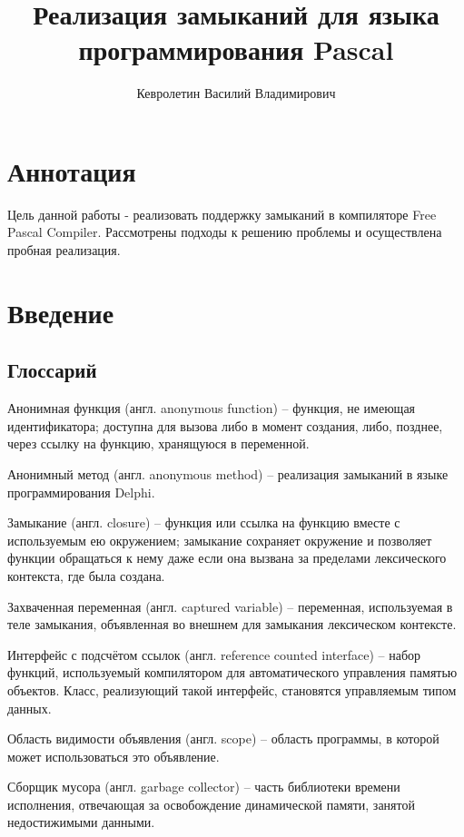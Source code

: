 \documentclass{imcs}
\title{Реализация замыканий для языка программирования Pascal}
\author{Кевролетин Василий Владимирович}
\begin{document}
\maketitle

\tableofcontents
\pagebreak

\section*{Аннотация}
Цель данной работы - реализовать поддержку замыканий в компиляторе Free Pascal Compiler.
Рассмотрены подходы к решению проблемы и осуществлена пробная реализация.

\pagebreak

\section{Введение}
\subsection{Глоссарий}

Анонимная функция (англ. anonymous function) -- функция, не имеющая идентификатора; доступна для
вызова либо в момент создания, либо, позднее, через ссылку на функцию,
хранящуюся в переменной.

Анонимный метод (англ. anonymous method) -- реализация замыканий в языке программирования Delphi\cite{anonymmethods}. 

Замыкание (англ. closure) -- функция или ссылка на функцию вместе с используемым ею
окружением; замыкание сохраняет окружение и позволяет функции
обращаться к нему даже если она вызвана за пределами лексического
контекста, где была создана.

Захваченная переменная (англ. captured variable) -- переменная, используемая в теле замыкания,
объявленная во внешнем для замыкания лексическом контексте.

Интерфейс с подсчётом ссылок (англ. reference counted interface) -- набор функций, используемый компилятором для
автоматического управления памятью объектов. Класс, реализующий такой интерфейс,
становятся управляемым типом данных.

Область видимости объявления (англ. scope) -- область программы, в которой может 
использоваться это объявление.

Сборщик мусора (англ. garbage collector) -- часть библиотеки времени исполнения, отвечающая за освобождение
динамической памяти, занятой недостижимыми данными.
\end{document}
